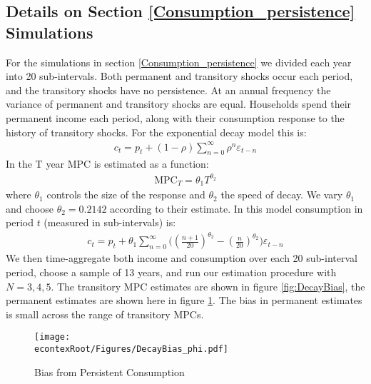 \documentclass[titlepage]{\econtex}\newcommand{\texname}{ConsumptionHeterogeneity}
\begin{document}
\subsection{Details on Section \ref{Consumption_persistence} Simulations}
For the simulations in section \ref{Consumption_persistence} we divided each year into 20 sub-intervals. Both permanent and transitory shocks occur each period, and the transitory shocks have no persistence. At an annual frequency the variance of permanent and transitory shocks are equal. Households spend their permanent income each period, along with their consumption response to the history of transitory shocks. For the exponential decay model this is:
\begin{align*}
c_t = p_t + (1-\rho)\sum_{n=0}^{\infty}\rho^n \varepsilon_{t-n}
\end{align*}
In \cite{fagereng_mpc_2016} the T year MPC is estimated as a function:
\begin{align*}
\text{MPC}_T = \theta_1 T^{\theta_2}
\end{align*}
where $\theta_1$ controls the size of the response and $\theta_2$ the speed of decay. We vary $\theta_1$ and choose $\theta_2= 0.2142$ according to their estimate. In this model consumption in period $t$ (measured in sub-intervals) is:
\begin{align*}
c_t = p_t + \theta_1\sum_{n=0}^{\infty}\Big( (\frac{n+1}{20})^{\theta_2} -(\frac{n}{20})^{\theta_2} \Big)\varepsilon_{t-n}
\end{align*}
We then time-aggregate both income and consumption over each 20 sub-interval period, choose a sample of 13 years, and run our estimation procedure with $N=3,4,5$. The transitory MPC estimates are shown in figure \ref{fig:DecayBias}, the permanent estimates are shown here in figure \ref{fig:DecayBias_phi}. The bias in permanent estimates is small across the range of transitory MPCs.
\begin{figure} 
	\begin{centering}
		\texttt{[image: \\econtexRoot/Figures/DecayBias\_phi.pdf]}
		\caption{Bias from Persistent Consumption}
		\label{fig:DecayBias_phi}
	\end{centering}
\end{figure}
\end{document}
